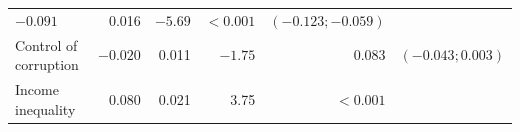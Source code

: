\documentclass[11pt,a4paper,openany]{book}
\begin{document}
\begin{longtable}[]{@{}lrrrrc@{}}
\begin{minipage}[t]{0.09\columnwidth}
\(-0.091\)\strut
\end{minipage} & \begin{minipage}[t]{0.05\columnwidth}\raggedleft\strut
0.016\strut
\end{minipage} & \begin{minipage}[t]{0.06\columnwidth}\raggedleft\strut
\(-5.69\)\strut
\end{minipage} & \begin{minipage}[t]{0.08\columnwidth}\raggedleft\strut
\(<0.001\)\strut
\end{minipage} & \begin{minipage}[t]{0.10\columnwidth}\centering\strut
\((-0.123; -0.059)\)\strut
\end{minipage}\tabularnewline
\begin{minipage}[t]{0.44\columnwidth}\raggedright\strut
Control of corruption\strut
\end{minipage} & \begin{minipage}[t]{0.09\columnwidth}\raggedleft\strut
\(-0.020\)\strut
\end{minipage} & \begin{minipage}[t]{0.05\columnwidth}\raggedleft\strut
0.011\strut
\end{minipage} & \begin{minipage}[t]{0.06\columnwidth}\raggedleft\strut
\(-1.75\)\strut
\end{minipage} & \begin{minipage}[t]{0.08\columnwidth}\raggedleft\strut
\(0.083\)\strut
\end{minipage} & \begin{minipage}[t]{0.10\columnwidth}\centering\strut
\((-0.043; 0.003)\)\strut
\end{minipage}\tabularnewline
\begin{minipage}[t]{0.44\columnwidth}\raggedright\strut
Income inequality\strut
\end{minipage} & \begin{minipage}[t]{0.09\columnwidth}\raggedleft\strut
0.080\strut
\end{minipage} & \begin{minipage}[t]{0.05\columnwidth}\raggedleft\strut
0.021\strut
\end{minipage} & \begin{minipage}[t]{0.06\columnwidth}\raggedleft\strut
3.75\strut
\end{minipage} & \begin{minipage}[t]{0.08\columnwidth}\raggedleft\strut
\(<0.001\)\strut
\end{minipage} & \begin{minipage}[t]{0.10\columnwidth}\centering\strut

\end{minipage}
\end{longtable}
\end{document}
